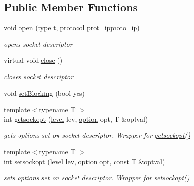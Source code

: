 \subsection*{Public Member Functions}
\begin{CompactItemize}
\item 
void \hyperlink{classsocketpp_1_1BaseSocket_2060dc1b648f83f8bf5ae3d9ecfcd619}{open} (\hyperlink{namespacesocketpp_635f4c3b3f85aba331587404d59ae52d}{type} t, \hyperlink{namespacesocketpp_2969678def1c6c8cb4102802ca82e2cf}{protocol} prot=ipproto\_\-ip)
\begin{CompactList}\small\item\em opens socket descriptor \item\end{CompactList}\item 
virtual void \hyperlink{classsocketpp_1_1BaseSocket_f067195056bb6b5a65c4bc1d2ac7da72}{close} ()
\begin{CompactList}\small\item\em closes socket descriptor \item\end{CompactList}\item 
void \hyperlink{classsocketpp_1_1BaseSocket_4cffcd5cae4ef51e953495837fade4c3}{setBlocking} (bool yes)
\item 
{\footnotesize template$<$typename T $>$ }\\int \hyperlink{classsocketpp_1_1BaseSocket_c845c3a037f0f400fd50dfb58706b6e4}{getsockopt} (\hyperlink{namespacesocketpp_4dbb83d08769b55fc6e283b73ae11bb5}{level} lev, \hyperlink{namespacesocketpp_ea335944de1f6b81489c90507884cfc4}{option} opt, T \&optval)
\begin{CompactList}\small\item\em gets options set on socket descriptor. Wrapper for \hyperlink{classsocketpp_1_1BaseSocket_c845c3a037f0f400fd50dfb58706b6e4}{getsockopt()} \item\end{CompactList}\item 
{\footnotesize template$<$typename T $>$ }\\int \hyperlink{classsocketpp_1_1BaseSocket_3f1f168e4953c046bb1159941da2fa30}{setsockopt} (\hyperlink{namespacesocketpp_4dbb83d08769b55fc6e283b73ae11bb5}{level} lev, \hyperlink{namespacesocketpp_ea335944de1f6b81489c90507884cfc4}{option} opt, const T \&optval)
\begin{CompactList}\small\item\em sets options set on socket descriptor. Wrapper for \hyperlink{classsocketpp_1_1BaseSocket_3f1f168e4953c046bb1159941da2fa30}{setsockopt()} \item\end{CompactList}\item 

\end{CompactItemize}

